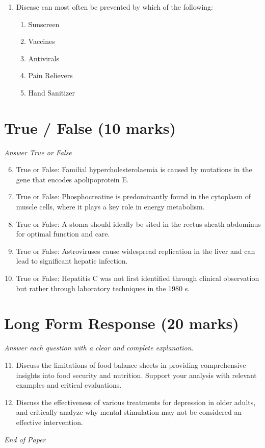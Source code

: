 \documentclass[12pt]{article}
\begin{document}
\begin{enumerate}[label=\arabic*.]
\begin{enumerate}[label=(\alph*)]
    \item Increased risk of mortality
    \item Goitre
    \item Increased risk of obesity
    \item Increased risk of heart disease
\end{enumerate}
\item Disease can most often be prevented by which of the following:
\begin{enumerate}[label=(\alph*)]
    \item Sunscreen
    \item Vaccines
    \item Antivirals
    \item Pain Relievers
    \item Hand Sanitizer
\end{enumerate}
\end{enumerate}

\section*{True / False (10 marks)}
\textit{Answer True or False}
\begin{enumerate}[label=\arabic*.]
\setcounter{enumi}{5}
\item True or False: Familial hypercholesterolaemia is caused by mutations in the gene that encodes apolipoprotein E.
\item True or False: Phosphocreatine is predominantly found in the cytoplasm of muscle cells, where it plays a key role in energy metabolism.
\item True or False: A stoma should ideally be sited in the rectus sheath abdominus for optimal function and care.
\item True or False: Astroviruses cause widespread replication in the liver and can lead to significant hepatic infection.
\item True or False: Hepatitis C was not first identified through clinical observation but rather through laboratory techniques in the 1980 s.
\end{enumerate}

\section*{Long Form Response (20 marks)}
\textit{Answer each question with a clear and complete explanation.}
\begin{enumerate}[label=\arabic*.]
\setcounter{enumi}{10}
\item Discuss the limitations of food balance sheets in providing comprehensive insights into food security and nutrition. Support your analysis with relevant examples and critical evaluations.
\item Discuss the effectiveness of various treatments for depression in older adults, and critically analyze why mental stimulation may not be considered an effective intervention.
\end{enumerate}

\vfill
\noindent\textit{End of Paper}
\end{document}
